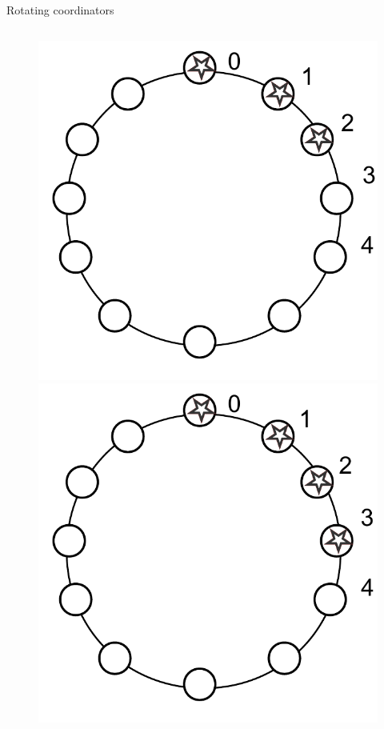 \begin{frame}{Rotating coordinators}
\begin{columns}
\begin{column}{0.4\textwidth}
\begin{figure}
\begin{overprint}
			\includegraphics[width=\textwidth]{rotating3}
			\onslide<5|handout:1>\includegraphics[width=\textwidth]{rotating4}
		\end{overprint}
	\end{figure}
\end{column}
\end{columns}

\end{frame}

